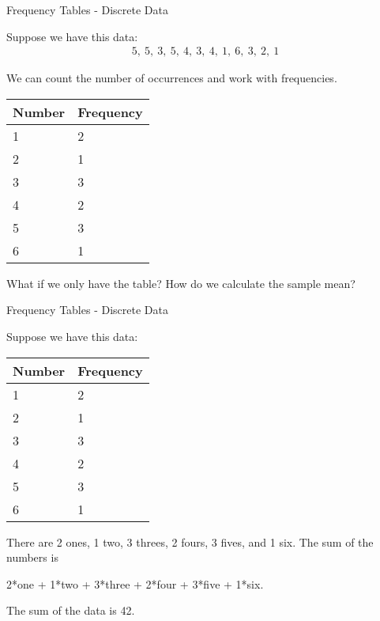 \begin{frame}{Frequency Tables - Discrete Data}

  Suppose we have this data:
  \begin{eqnarray*}
    5,~5,~3,~5,~4,~3,~4,~1,~6,~3,~2,~1
  \end{eqnarray*}

  We can count the number of occurrences and work with frequencies.

  {
    \begin{tabular}{l|l}
      Number  & Frequency \\ \hline
      1 & 2 \\
      2 & 1 \\
      3 & 3 \\
      4 & 2 \\
      5 & 3 \\
      6 & 1 
    \end{tabular}
  }

  {
    What if we only have the table? How do we calculate the sample
    mean?
  }

  
\end{frame}


\begin{frame}{Frequency Tables - Discrete Data}

  Suppose we have this data: \\
    \begin{tabular}{l|l}
      Number  & Frequency \\ \hline
      1 & {\color{red}2} \\
      2 & {\color{red}1} \\
      3 & {\color{red}3} \\
      4 & {\color{red}2} \\
      5 & {\color{red}3} \\
      6 & {\color{red}1}
    \end{tabular}

    {

      There are {\color{red}2} ones, {\color{red}1} two,
      {\color{red}3} threes, {\color{red}2} fours, {\color{red}3}
      fives, and {\color{red}1}
      six. The sum of the numbers is  \\
      \begin{center}
        {\color{red}2}*one + {\color{red}1}*two + {\color{red}3}*three
        + {\color{red}2}*four + {\color{red}3}*five + {\color{red}1}*six.
      \end{center}

      {
        The sum of the data is 42.
      }
    }
  
\end{frame}


